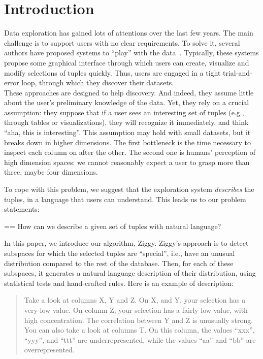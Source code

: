 \section{Introduction}
\label{sec:introdction}
Data exploration has gained lots of attentions over the last few years. The
main challenge is to support users with no clear requirements. To solve it,
several authors have proposed systems to ``play'' with the
data~\cite{abouzied2012dataplay, sellam2013meet, liarou2014dbtouch,
dimitriadou2014explore}. Typically, these systems propose some graphical
interface through which users can create, visualize and modify selections of
tuples quickly. Thus, users are engaged in a tight trial-and-error loop,
through which they discover their datasets.\\
These approaches are designed to help discovery. And indeed, they assume little
about the user's preliminary knowledge of the data. Yet, they rely on a crucial
assumption: they suppose that if a user sees an interesting set of tuples
(e.g., through tables or visualizations), they will recognize it immediately,
and think ``aha, this is interesting''. This assumption may hold with small
datasets, but it breaks down in higher dimensions. The first bottleneck is the
time necessary to inspect each column on after the other. The second one  is
humans' perception of high dimension spaces:  we cannot reasonably expect a
user to grasp more than three, maybe four dimensions. 

To cope with this problem, we suggest that the exploration system
\emph{describes} the tuples, in a language that users can understand. This
leads us to our problem statements:
\begin{framed}
    \everypar={{=\lastbox}\everypar{}}
How can we describe a given set of tuples with natural language?
\end{framed}
In this paper, we introduce our algorithm, Ziggy. Ziggy's approach is to detect
subspaces for which the selected tuples are ``special'', i.e., have an unusual
distribution compared to the rest of the database. Then, for each of these
subspaces, it generates a natural language description of their distribution,
using statistical tests and hand-crafted rules. Here is an example of
description:
\begin{quote}
    Take a look at columns X, Y and Z. On X, and Y, your selection has a very
    low value. On column Z, your selection has a fairly low value, with high
    concentration. The correlation between Y and Z is unusually strong.\\
    You can also take a look at columns T. On this column, the
    values ``xxx'', ``yyy'', and ``ttt'' are underrepresented, while the values
    ``aa'' and ``bb'' are overrepresented.
\end{quote}

